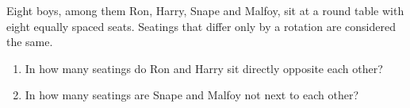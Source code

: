 Eight boys, among them Ron, Harry, Snape and Malfoy, sit at a round table with eight equally spaced seats. Seatings that differ only by a rotation are considered the same.
\begin{enumerate}
\item[(a)] In how many seatings do Ron and Harry sit directly opposite each other?
\item[(b)] In how many seatings are Snape and Malfoy not next to each other?
\end{enumerate}
